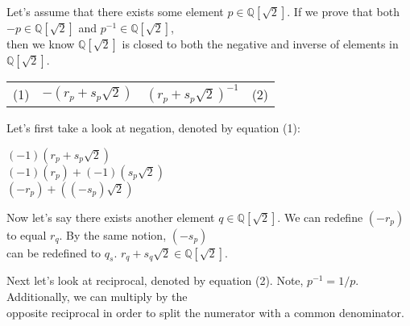 \documentclass{article}
\begin{document}
\begin{flushleft}
\begin{enumerate}[a)]
\begin{flushleft}
\qquad Let's assume that there exists some element $p \in \mathbb{Q}[\sqrt{2}]$. If we prove that both $-p \in \mathbb{Q}[\sqrt{2}]$ and $p^{-1} \in \mathbb{Q}[\sqrt{2}]$, \\
\qquad then we know $\mathbb{Q}[\sqrt{2}]$ is closed to both the negative and inverse of elements in $\mathbb{Q}[\sqrt{2}]$.
\begin{center}
\begin{tabular}{r c c l}
(1) & $-(r_p + s_p \sqrt{2})$ & $(r_p + s_p \sqrt{2})^{-1}$ & (2)
\end{tabular}
\end{center}
\qquad Let's first take a look at negation, denoted by equation (1): \\
\begin{center}
$(-1)(r_p + s_p \sqrt{2})$ \\
\vspace{0.25cm}
$(-1)(r_p) + (-1)(s_p \sqrt{2})$ \\
\vspace{0.25cm}
$(-r_p) + ((-s_p) \sqrt{2})$\\
\end{center}
\qquad Now let's say there exists another element $q \in \mathbb{Q}[\sqrt{2}]$. We can redefine $(-r_p)$ to equal $r_q$. By the same notion, $(-s_p)$ \\
\qquad can be redefined to $q_s$. $r_q + s_q \sqrt{2} \in \mathbb{Q}[\sqrt{2}]$.

\vspace{.5cm}

\qquad Next let's look at reciprocal, denoted by equation (2). Note, $p^{-1} = 1/p$. Additionally, we can multiply by the \\
\qquad opposite reciprocal in order to split the numerator with a common denominator.\\


\end{flushleft}
\end{enumerate}
\end{flushleft}
\end{document}

